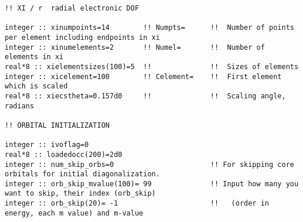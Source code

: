 \begin{verbatim}
!! XI / r  radial electronic DOF

integer :: xinumpoints=14        !! Numpts=      !!  Number of points per element including endpoints in xi
integer :: xinumelements=2       !! Numel=       !!  Number of elements in xi
real*8 :: xielementsizes(100)=5  !!              !!  Sizes of elements
integer :: xicelement=100        !! Celement=    !!  First element which is scaled
real*8 :: xiecstheta=0.157d0     !!              !!  Scaling angle, radians

!! ORBITAL INITIALIZATION

integer :: ivoflag=0
real*8 :: loadedocc(200)=2d0
integer :: num_skip_orbs=0                       !! For skipping core orbitals for initial diagonalization.
integer :: orb_skip_mvalue(100)= 99              !! Input how many you want to skip, their index (orb_skip)
integer :: orb_skip(20)= -1                      !!   (order in energy, each m value) and m-value
\end{verbatim}

